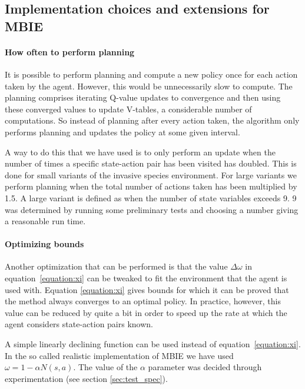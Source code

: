 \subsection{Implementation choices and extensions for MBIE}
\label{sec:MBIE_our_contribution}

\paragraph{How often to perform planning}
\label{sec:mbie_perform_planning}

It is possible to perform planning and compute a new policy once for each
action taken by the agent. However, this would be unnecessarily slow to
compute. The planning comprises iterating Q-value updates to convergence and
then using these converged values to update V-tables, a considerable number of
computations. So instead of planning after every action taken, the algorithm
only performs planning and updates the policy at some given interval. 

A way to do this that we have used is to only perform an update when the number
of times a specific state-action pair has been visited has doubled. This is
done for small variants of the invasive species environment. For large variants
we perform planning when the total number of actions taken has been multiplied
by 1.5. A large variant is defined as when the number of state variables
exceeds 9. 9 was determined by running some preliminary tests and
choosing a number giving a reasonable run time.

\paragraph{Optimizing bounds}

Another optimization that can be performed is that the value $\Delta \omega$ in
equation~\eqref{equation:xi} can be tweaked to fit the environment that the
agent is used with. Equation \eqref{equation:xi} gives bounds for which it can
be proved that the method always converges to an optimal policy. In practice,
however, this value can be reduced by quite a bit in order to speed up the rate
at which the agent considers state-action pairs known. 

A simple linearly declining function can be used instead of
equation~\eqref{equation:xi}. In the so called realistic implementation of MBIE we have
used $\omega = 1 - \alpha N(s,a).$ The value of the $\alpha$ parameter was decided through experimentation (see section \ref{sec:test_spec}).

